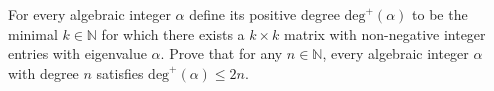 For every algebraic integer $\alpha$ define its positive degree $\text{deg}^+(\alpha)$ to be the minimal $k\in\mathbb{N}$ for which there exists a $k\times k$ matrix with non-negative integer entries with eigenvalue $\alpha$. Prove that for any $n\in\mathbb{N}$, every algebraic integer $\alpha$ with degree $n$ satisfies $\text{deg}^+(\alpha)\le 2n$.